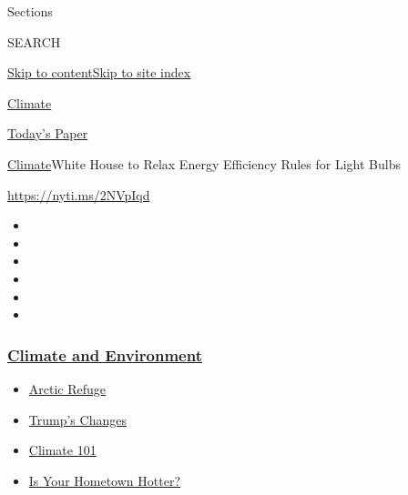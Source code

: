 Sections

SEARCH

\protect\hyperlink{site-content}{Skip to
content}\protect\hyperlink{site-index}{Skip to site index}

\href{https://www.nytimes3xbfgragh.onion/section/climate}{Climate}

\href{https://myaccount.nytimes3xbfgragh.onion/auth/login?response_type=cookie\&client_id=vi}{}

\href{https://www.nytimes3xbfgragh.onion/section/todayspaper}{Today's
Paper}

\href{/section/climate}{Climate}\textbar{}White House to Relax Energy
Efficiency Rules for Light Bulbs

\url{https://nyti.ms/2NVpIqd}

\begin{itemize}
\item
\item
\item
\item
\item
\item
\end{itemize}

\hypertarget{climate-and-environment}{%
\subsubsection{\texorpdfstring{\href{https://www.nytimes3xbfgragh.onion/section/climate?name=styln-climate\&region=TOP_BANNER\&variant=undefined\&block=storyline_menu_recirc\&action=click\&pgtype=Article\&impression_id=15513250-e3b5-11ea-8546-498a940a9789}{Climate
and
Environment}}{Climate and Environment}}\label{climate-and-environment}}

\begin{itemize}
\tightlist
\item
  \href{https://www.nytimes3xbfgragh.onion/2020/08/17/climate/alaska-oil-drilling-anwr.html?name=styln-climate\&region=TOP_BANNER\&variant=undefined\&block=storyline_menu_recirc\&action=click\&pgtype=Article\&impression_id=15513251-e3b5-11ea-8546-498a940a9789}{Arctic
  Refuge}
\item
  \href{https://www.nytimes3xbfgragh.onion/interactive/2020/climate/trump-environment-rollbacks.html?name=styln-climate\&region=TOP_BANNER\&variant=undefined\&block=storyline_menu_recirc\&action=click\&pgtype=Article\&impression_id=15513252-e3b5-11ea-8546-498a940a9789}{Trump's
  Changes}
\item
  \href{https://www.nytimes3xbfgragh.onion/interactive/2020/04/19/climate/climate-crash-course-1.html?name=styln-climate\&region=TOP_BANNER\&variant=undefined\&block=storyline_menu_recirc\&action=click\&pgtype=Article\&impression_id=15515960-e3b5-11ea-8546-498a940a9789}{Climate
  101}
\item
  \href{https://www.nytimes3xbfgragh.onion/interactive/2018/08/30/climate/how-much-hotter-is-your-hometown.html?name=styln-climate\&region=TOP_BANNER\&variant=undefined\&block=storyline_menu_recirc\&action=click\&pgtype=Article\&impression_id=15515961-e3b5-11ea-8546-498a940a9789}{Is
  Your Hometown Hotter?}
\end{itemize}

